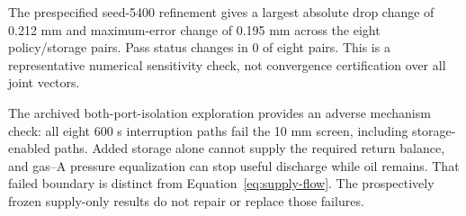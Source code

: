 The prespecified seed-5400 refinement gives a largest absolute drop change of 0.212 mm and maximum-error change of 0.195 mm across the eight policy/storage pairs. Pass status changes in 0 of eight pairs. This is a representative numerical sensitivity check, not convergence certification over all joint vectors.

The archived both-port-isolation exploration provides an adverse mechanism check: all eight 600 s interruption paths fail the 10 mm screen, including storage-enabled paths. Added storage alone cannot supply the required return balance, and gas--A pressure equalization can stop useful discharge while oil remains. That failed boundary is distinct from Equation~\eqref{eq:supply-flow}. The prospectively frozen supply-only results do not repair or replace those failures.
